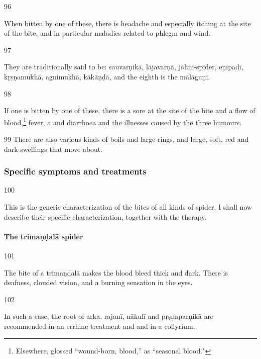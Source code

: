 \begin{translation}
 \item[96]
 
 When bitten by one of these, there is headache and especially itching
at the site of the bite, and in particular maladies related to phlegm
and wind.
 
 \item[97]
 
 They are traditionally said to be:
 \label{sauvarnika-group}
 \Gls{sauvarṇikā},
 \Gls{lājavarṇā},
 \Gls{jālinī-spider},
 \Gls{eṇīpadī},
 \Gls{kṛṣṇamukhā},
 \Gls{agnimukhā},
 \Gls{kākāṇḍā}, and the eighth is the
 \Gls{mālāguṇī}.

\item[98]

If one is bitten by one of these, there is a sore at the site of the
bite and a flow of blood,\footnote{Elsewhere, 
    glossed  “wound-born, blood,” as 
    “seasonal blood."} fever, a  and diarrhoea and
    the illnesses caused by the three humours.
 
\item[99]
 There are also various kinds of boils and large rings, and large, soft, red and 
 dark swellings that move about.
 
\subsubsection{Specific symptoms and treatments}
 
 \item[100]
 
This is the generic characterization of the bites of all kinds of
spider.  I shall now describe their specific characterization,
together with the therapy. 


\paragraph{The \Gls{trimaṇḍalā} spider}

\item [101]

The bite of a \Gls{trimaṇḍalā} makes the blood bleed thick and dark. 
There is deafness, clouded vision, and a burning sensation in the
eyes.

\item[102]

In such a case, the root of \gls{arka}, \gls{rajanī}, \gls{nākulī} and 
\gls{pṛṣṇaparṇikā} are recommended in an errhine treatment and
 and in a collyrium. 



\end{translation}
